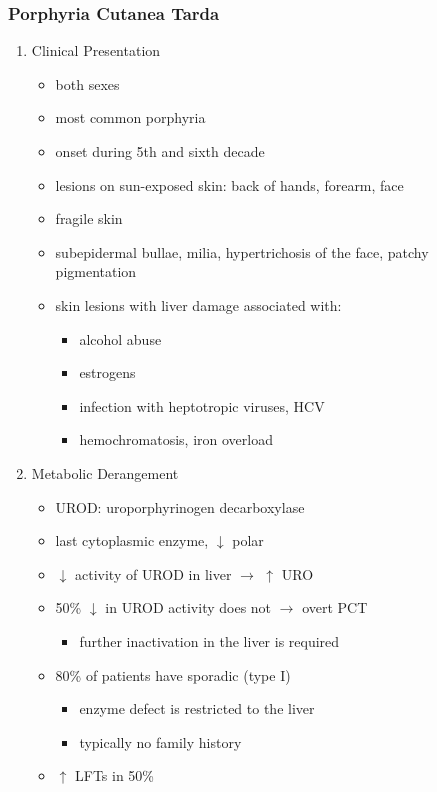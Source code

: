 \documentclass[12pt]{scrartcl}
\begin{document}
\subsubsection{Porphyria Cutanea Tarda}
\label{sec:org0ed37c0}
\begin{enumerate}
\item Clinical Presentation
\label{sec:orged43def}
\begin{itemize}
\item both sexes
\item most common porphyria
\item onset during 5th and sixth decade
\item lesions on sun-exposed skin: back of hands, forearm, face
\item fragile skin
\item subepidermal bullae, milia, hypertrichosis of the face, patchy pigmentation
\item skin lesions with liver damage associated with:
\begin{itemize}
\item alcohol abuse
\item estrogens
\item infection with heptotropic viruses, HCV
\item hemochromatosis, iron overload
\end{itemize}
\end{itemize}
\item Metabolic Derangement
\label{sec:org852ecd5}
\begin{itemize}
\item UROD: uroporphyrinogen decarboxylase
\item last cytoplasmic enzyme, \(\downarrow\) polar
\item \(\downarrow\) activity of UROD in liver \(\to\) \(\uparrow\) URO
\item 50\% \(\downarrow\) in UROD activity does not \(\to\) overt PCT
\begin{itemize}
\item further inactivation in the liver is required
\end{itemize}
\item 80\% of patients have sporadic (type I)
\begin{itemize}
\item enzyme defect is restricted to the liver
\item typically no family history
\end{itemize}
\item \(\uparrow\) LFTs in 50\%

\end{itemize}
\end{enumerate}
\end{document}
